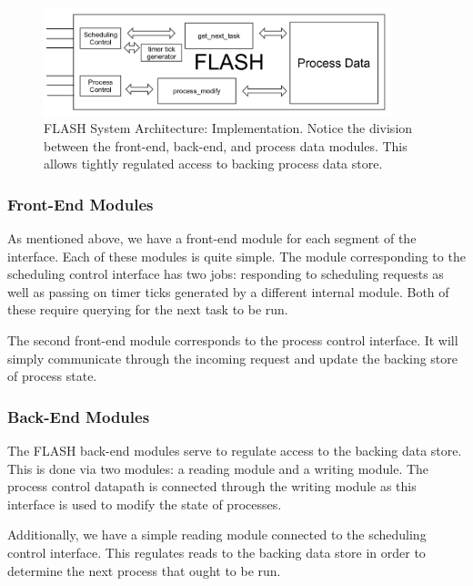 \documentclass{sig-alternate-10pt}
\begin{document}
\begin{figure}
	\begin{center}
		\includegraphics[width=0.9\textwidth]{fig/flash-impl.png}
		\caption{
			FLASH System Architecture: Implementation.  Notice the division
			between the front-end, back-end, and process data modules.  This
			allows tightly regulated access to backing process data store.
		}
		\label{fig:impl_overview}
	\end{center}
\end{figure}

\subsubsection{Front-End Modules}
As mentioned above, we have a front-end module for each segment of the
interface.  Each of these modules is quite simple.  The module corresponding
to the scheduling control interface has two jobs: responding to scheduling requests
as well as passing on timer ticks generated by a different internal module.
Both of these require querying for the next task to be run.

The second front-end module corresponds to the process control interface.
It will simply communicate through the incoming request and update the
backing store of process state.

\subsubsection{Back-End Modules}
The FLASH back-end modules serve to regulate access to the backing data
store.  This is done via two modules: a reading module and a writing module.
The process control datapath is connected through the writing module as this
interface is used to modify the state of processes.

Additionally, we have a simple reading module connected to the scheduling
control interface.  This regulates reads to the backing data store in order
to determine the next process that ought to be run.
\end{document}
